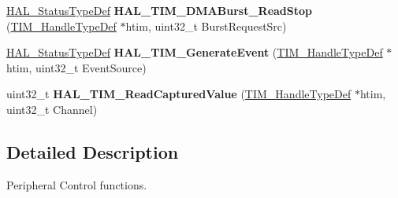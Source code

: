 \begin{DoxyCompactItemize}
\item 
\mbox{\label{group___t_i_m___exported___functions___group8_ga41cfa290ee87229cba1962e78e2a9d01}} 
\hyperlink{stm32f4xx__hal__def_8h_a63c0679d1cb8b8c684fbb0632743478f}{H\+A\+L\+\_\+\+Status\+Type\+Def} {\bfseries H\+A\+L\+\_\+\+T\+I\+M\+\_\+\+D\+M\+A\+Burst\+\_\+\+Read\+Stop} (\hyperlink{struct_t_i_m___handle_type_def}{T\+I\+M\+\_\+\+Handle\+Type\+Def} $\ast$htim, uint32\+\_\+t Burst\+Request\+Src)
\item 
\mbox{\label{group___t_i_m___exported___functions___group8_gab4a60fe7cbb64a321bdce2ee1b9c8730}} 
\hyperlink{stm32f4xx__hal__def_8h_a63c0679d1cb8b8c684fbb0632743478f}{H\+A\+L\+\_\+\+Status\+Type\+Def} {\bfseries H\+A\+L\+\_\+\+T\+I\+M\+\_\+\+Generate\+Event} (\hyperlink{struct_t_i_m___handle_type_def}{T\+I\+M\+\_\+\+Handle\+Type\+Def} $\ast$htim, uint32\+\_\+t Event\+Source)
\item 
\mbox{\label{group___t_i_m___exported___functions___group8_ga6528480e73e4e51d5ce8aaca00d64d13}} 
uint32\+\_\+t {\bfseries H\+A\+L\+\_\+\+T\+I\+M\+\_\+\+Read\+Captured\+Value} (\hyperlink{struct_t_i_m___handle_type_def}{T\+I\+M\+\_\+\+Handle\+Type\+Def} $\ast$htim, uint32\+\_\+t Channel)
\end{DoxyCompactItemize}


\subsection{Detailed Description}
Peripheral Control functions. 


